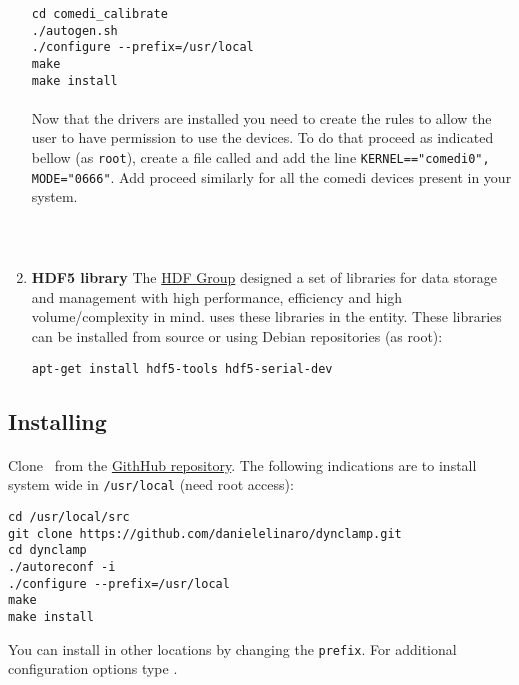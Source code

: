 \begin{enumerate}
\begin{lstlisting}
cd comedi_calibrate
./autogen.sh
./configure --prefix=/usr/local
make
make install
\end{lstlisting}

\paragraph{}
Now that the drivers are installed you need to create the rules to allow the user to have permission to use the devices. To do that proceed as indicated bellow (as \texttt{root}), create a file called  and add the line \texttt{KERNEL=="comedi0", MODE="0666"}. Add proceed similarly for all the comedi devices present in your system.

\begin{lstlisting}



\end{lstlisting}

\item \textbf{HDF5 library} 
The \href{http://www.hdfgroup.org/HDF5/}{HDF Group} designed a set of libraries for data storage and management with high performance, efficiency and high volume/complexity in mind. \textbf{\progname} uses these libraries in the  entity. These libraries can be installed from source or using Debian repositories (as root):
\begin{lstlisting}
apt-get install hdf5-tools hdf5-serial-dev
\end{lstlisting}


\end{enumerate}

\subsection{Installing \progname} 
\label{install:program}
\paragraph{}
Clone \progname\ from the \href{https://github.com/danielelinaro/dynclamp}{GithHub repository}. The following indications are to install system wide in \texttt{/usr/local} (need root access):
\begin{lstlisting}
cd /usr/local/src
git clone https://github.com/danielelinaro/dynclamp.git
cd dynclamp
./autoreconf -i
./configure --prefix=/usr/local
make
make install
\end{lstlisting}
You can install in other locations by changing the \texttt{prefix}.
For additional configuration options type .


